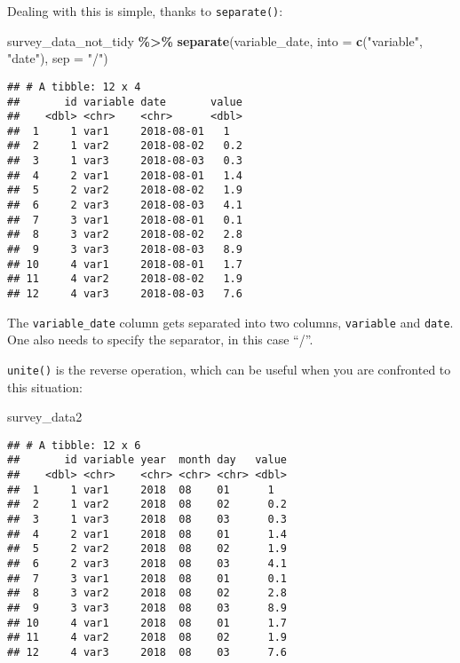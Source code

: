 \documentclass[
]{article}
\newenvironment{Shaded}{\begin{snugshade}}{\end{snugshade}}
\newcommand{\DataTypeTok}[1]{\textcolor[rgb]{0.13,0.29,0.53}{#1}}
\newcommand{\KeywordTok}[1]{\textcolor[rgb]{0.13,0.29,0.53}{\textbf{#1}}}
\newcommand{\NormalTok}[1]{#1}
\newcommand{\OperatorTok}[1]{\textcolor[rgb]{0.81,0.36,0.00}{\textbf{#1}}}
\newcommand{\StringTok}[1]{\textcolor[rgb]{0.31,0.60,0.02}{#1}}
\begin{document}
Dealing with this is simple, thanks to \texttt{separate()}:

\begin{Shaded}
\begin{Highlighting}[]
\NormalTok{survey\_data\_not\_tidy }\OperatorTok{\%\textgreater{}\%}
\StringTok{    }\KeywordTok{separate}\NormalTok{(variable\_date, }\DataTypeTok{into =} \KeywordTok{c}\NormalTok{(}\StringTok{"variable"}\NormalTok{, }\StringTok{"date"}\NormalTok{), }\DataTypeTok{sep =} \StringTok{"/"}\NormalTok{)}
\end{Highlighting}
\end{Shaded}

\begin{verbatim}
## # A tibble: 12 x 4
##       id variable date       value
##    <dbl> <chr>    <chr>      <dbl>
##  1     1 var1     2018-08-01   1  
##  2     1 var2     2018-08-02   0.2
##  3     1 var3     2018-08-03   0.3
##  4     2 var1     2018-08-01   1.4
##  5     2 var2     2018-08-02   1.9
##  6     2 var3     2018-08-03   4.1
##  7     3 var1     2018-08-01   0.1
##  8     3 var2     2018-08-02   2.8
##  9     3 var3     2018-08-03   8.9
## 10     4 var1     2018-08-01   1.7
## 11     4 var2     2018-08-02   1.9
## 12     4 var3     2018-08-03   7.6
\end{verbatim}

The \texttt{variable\_date} column gets separated into two columns, \texttt{variable} and \texttt{date}. One also needs
to specify the separator, in this case ``/''.

\texttt{unite()} is the reverse operation, which can be useful when you are confronted to this situation:

\begin{Shaded}
\begin{Highlighting}[]
\NormalTok{survey\_data2}
\end{Highlighting}
\end{Shaded}

\begin{verbatim}
## # A tibble: 12 x 6
##       id variable year  month day   value
##    <dbl> <chr>    <chr> <chr> <chr> <dbl>
##  1     1 var1     2018  08    01      1  
##  2     1 var2     2018  08    02      0.2
##  3     1 var3     2018  08    03      0.3
##  4     2 var1     2018  08    01      1.4
##  5     2 var2     2018  08    02      1.9
##  6     2 var3     2018  08    03      4.1
##  7     3 var1     2018  08    01      0.1
##  8     3 var2     2018  08    02      2.8
##  9     3 var3     2018  08    03      8.9
## 10     4 var1     2018  08    01      1.7
## 11     4 var2     2018  08    02      1.9
## 12     4 var3     2018  08    03      7.6
\end{verbatim}
\end{document}
